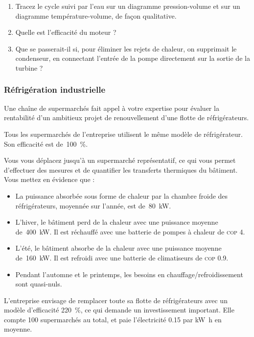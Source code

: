 	\begin{enumerate}
		\item Tracez le cycle suivi par l’eau sur un diagramme pression-volume et sur un diagramme température-volume, de façon qualitative.
		\item Quelle est l’efficacité du moteur ?
		\item Que se passerait-il si, pour éliminer les rejets de chaleur, on supprimait le condenseur, en connectant l’entrée de la pompe directement sur la sortie de la turbine ?
	\end{enumerate}


\subsubsection{Réfrigération industrielle}
\label{exo_refrigeration_supermache}

	Une chaîne de supermarchés fait appel à votre expertise pour évaluer la rentabilité d’un ambitieux projet de renouvellement d’une flotte de réfrigérateurs.
	
	Tous les supermarchés de l’entreprise utilisent le même modèle de réfrigérateur. Son efficacité est de~\SI{100}{\percent}.
	
	Vous vous déplacez jusqu’à un supermarché représentatif, ce qui vous permet d’effectuer des mesures et de quantifier les transferts thermiques du bâtiment. Vous mettez en évidence que :
	
	\begin{itemize}
		\item La puissance absorbée sous forme de chaleur par la chambre froide des réfrigérateurs, moyennée sur l’année, est de~\SI{80}{\kilo\watt}.
		\item L’hiver, le bâtiment perd de la chaleur avec une puissance moyenne de~\SI{400}{\kilo\watt}. Il est réchauffé avec une batterie de pompes à chaleur de \textsc{cop} \num{4}.
		\item L’été, le bâtiment absorbe de la chaleur avec une puissance moyenne de~\SI{160}{\kilo\watt}. Il est refroidi avec une batterie de climatiseurs de \textsc{cop} \num{0,9}.
		\item Pendant l’automne et le printemps, les besoins en chauffage/refroidissement sont quasi-nuls.
	\end{itemize}
	
	L’entreprise envisage de remplacer toute sa flotte de réfrigérateurs avec un modèle d’efficacité \SI{220}{\percent}, ce qui demande un investissement important. Elle compte 100 supermarchés au total, et paie l’électricité \SI{0,15}{\euroo} par \si{\kilo\watt\hour} en moyenne.
	
